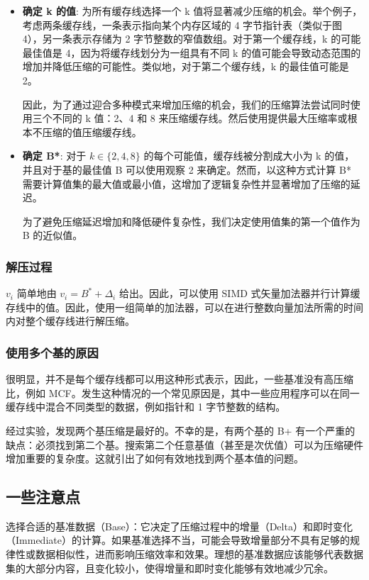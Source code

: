 \documentclass[12pt]{article}
\begin{document}
\begin{itemize}
    \item \textbf{确定 k 的值}: 为所有缓存线选择一个 k 值将显著减少压缩的机会。举个例子，考虑两条缓存线，一条表示指向某个内存区域的 4 字节指针表（类似于图 4），另一条表示存储为 2 字节整数的窄值数组。对于第一个缓存线，k 的可能最佳值是 4，因为将缓存线划分为一组具有不同 k 的值可能会导致动态范围的增加并降低压缩的可能性。类似地，对于第二个缓存线，k 的最佳值可能是 2。
    
    因此，为了通过迎合多种模式来增加压缩的机会，我们的压缩算法尝试同时使用三个不同的 k 值：2、4 和 8 来压缩缓存线。然后使用提供最大压缩率或根本不压缩的值压缩缓存线。
    
    \item \textbf{确定 B*}: 对于 $k \in \{2, 4, 8\}$ 的每个可能值，缓存线被分割成大小为 k 的值，并且对于基的最佳值 B 可以使用观察 2 来确定。然而，以这种方式计算 B* 需要计算值集的最大值或最小值，这增加了逻辑复杂性并显著增加了压缩的延迟。
    
    为了避免压缩延迟增加和降低硬件复杂性，我们决定使用值集的第一个值作为 B 的近似值。
\end{itemize}

\subsubsection{解压过程}

$v_i$ 简单地由 $v_i = B^* + \Delta_i$ 给出。因此，可以使用 SIMD 式矢量加法器并行计算缓存线中的值。因此，使用一组简单的加法器，可以在进行整数向量加法所需的时间内对整个缓存线进行解压缩。

\subsubsection{使用多个基的原因}

很明显，并不是每个缓存线都可以用这种形式表示，因此，一些基准没有高压缩比，例如 MCF。发生这种情况的一个常见原因是，其中一些应用程序可以在同一缓存线中混合不同类型的数据，例如指针和 1 字节整数的结构。

经过实验，发现两个基压缩是最好的。不幸的是，有两个基的 B+ 有一个严重的缺点：必须找到第二个基。搜索第二个任意基值（甚至是次优值）可以为压缩硬件增加重要的复杂度。这就引出了如何有效地找到两个基本值的问题。

\subsection{一些注意点}
选择合适的基准数据（Base）：它决定了压缩过程中的增量（Delta）和即时变化（Immediate）的计算。如果基准选择不当，可能会导致增量部分不具有足够的规律性或数据相似性，进而影响压缩效率和效果。理想的基准数据应该能够代表数据集的大部分内容，且变化较小，使得增量和即时变化能够有效地减少冗余。
\end{document}
